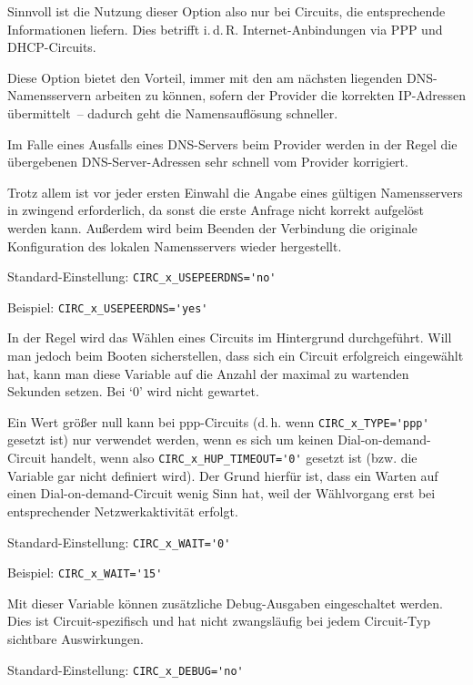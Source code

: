 \begin{description}
Sinnvoll ist die Nutzung dieser Option also nur bei Circuits, die entsprechende
Informationen liefern. Dies betrifft i.\,d.\,R. Internet-Anbindungen via PPP
und DHCP-Circuits.

Diese Option bietet den Vorteil, immer mit den am nächsten liegenden
DNS-Namensser\-vern arbeiten zu können, sofern der Provider die korrekten
IP-Adressen übermittelt~-- dadurch geht die Namensauflösung schneller.

Im Falle eines Ausfalls eines DNS-Servers beim Provider werden in der Regel die
übergebenen DNS-Server-Adressen sehr schnell vom Provider korrigiert.

Trotz allem ist vor jeder ersten Einwahl die Angabe eines gültigen
Namensservers in  zwingend erforderlich, da sonst die
erste Anfrage nicht korrekt aufgelöst werden kann. Außerdem wird beim Beenden
der Verbindung die originale Konfiguration des lokalen Namensservers wieder
hergestellt.

Standard-Einstellung: \verb+CIRC_x_USEPEERDNS='no'+

Beispiel: \verb+CIRC_x_USEPEERDNS='yes'+


In der Regel wird das Wählen eines Circuits im Hintergrund durchgeführt. Will
man jedoch beim Booten sicherstellen, dass sich ein Circuit erfolgreich
eingewählt hat, kann man diese Variable auf die Anzahl der maximal zu wartenden
Sekunden setzen. Bei `0' wird nicht gewartet.

Ein Wert größer null kann bei ppp-Circuits (d.\,h. wenn
\verb+CIRC_x_TYPE='ppp'+ gesetzt ist)
nur verwendet werden, wenn es sich um keinen Dial-on-demand-Circuit handelt,
wenn also \verb+CIRC_x_HUP_TIMEOUT='0'+ gesetzt ist (bzw. die Variable gar
nicht definiert wird). Der Grund hierfür ist, dass ein Warten auf einen
Dial-on-demand-Circuit wenig Sinn hat, weil der Wählvorgang erst bei
entsprechender Netzwerkaktivität erfolgt.

Standard-Einstellung: \verb+CIRC_x_WAIT='0'+

Beispiel: \verb+CIRC_x_WAIT='15'+


Mit dieser Variable können zusätzliche Debug-Ausgaben eingeschaltet werden.
Dies ist Circuit-spezifisch und hat nicht zwangsläufig bei jedem Circuit-Typ
sichtbare Auswirkungen.

Standard-Einstellung: \verb+CIRC_x_DEBUG='no'+


\end{description}
